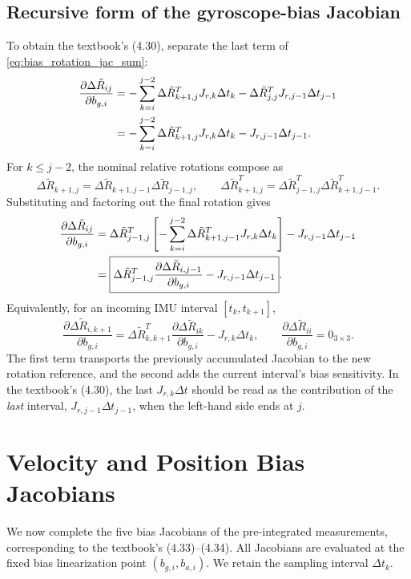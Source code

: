 \documentclass[11pt,a4paper]{article}
\begin{document}
\subsection{Recursive form of the gyroscope-bias Jacobian}
To obtain the textbook's (4.30), separate the last term of
\eqref{eq:bias_rotation_jac_sum}:
\begin{align}
\frac{\partial\Delta\tilde R_{ij}}{\partial b_{g,i}}
&=-\sum_{k=i}^{j-2}\Delta\tilde R_{k+1,j}^{T}
J_{r,k}\Delta t_k
-\Delta\tilde R_{j,j}^{T}J_{r,j-1}\Delta t_{j-1}\notag\\
&=-\sum_{k=i}^{j-2}\Delta\tilde R_{k+1,j}^{T}
J_{r,k}\Delta t_k-J_{r,j-1}\Delta t_{j-1}.
\end{align}
For $k\le j-2$, the nominal relative rotations compose as
\begin{equation}
\Delta\tilde R_{k+1,j}
=\Delta\tilde R_{k+1,j-1}\Delta\tilde R_{j-1,j},
\qquad
\Delta\tilde R_{k+1,j}^{T}
=\Delta\tilde R_{j-1,j}^{T}\Delta\tilde R_{k+1,j-1}^{T}.
\end{equation}
Substituting and factoring out the final rotation gives
\begin{align}
\frac{\partial\Delta\tilde R_{ij}}{\partial b_{g,i}}
&=\Delta\tilde R_{j-1,j}^{T}
\left[-\sum_{k=i}^{j-2}\Delta\tilde R_{k+1,j-1}^{T}
J_{r,k}\Delta t_k\right]-J_{r,j-1}\Delta t_{j-1}\notag\\
&=\boxed{\Delta\tilde R_{j-1,j}^{T}
\frac{\partial\Delta\tilde R_{i,j-1}}{\partial b_{g,i}}-J_{r,j-1}\Delta t_{j-1}}.
\end{align}
Equivalently, for an incoming IMU interval $[t_k,t_{k+1}]$,
\begin{equation}\label{eq:bias_rotation_jac_rec}
\boxed{\frac{\partial\Delta\tilde R_{i,k+1}}{\partial b_{g,i}}
=\Delta\tilde R_{k,k+1}^{T}\frac{\partial\Delta\tilde R_{ik}}{\partial b_{g,i}}
-J_{r,k}\Delta t_k,\qquad \frac{\partial\Delta\tilde R_{ii}}{\partial b_{g,i}}=0_{3\times3}.}
\end{equation}
The first term transports the previously accumulated Jacobian to the
new rotation reference, and the second adds the current interval's
bias sensitivity. In the textbook's (4.30), the last $J_{r,k}\Delta t$
should be read as the contribution of the \emph{last} interval,
$J_{r,j-1}\Delta t_{j-1}$, when the left-hand side ends at $j$.


\section{Velocity and Position Bias Jacobians}
We now complete the five bias Jacobians of the pre-integrated
measurements, corresponding to the textbook's (4.33)--(4.34).
All Jacobians are evaluated at the fixed bias linearization point
$(b_{g,i},b_{a,i})$. We retain the sampling interval $\Delta t_k$.
\end{document}
